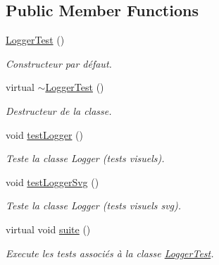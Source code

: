 \subsection*{Public Member Functions}
\begin{DoxyCompactItemize}
\item 
\mbox{\label{classtest_1_1LoggerTest_ad5efe60d6edd7cd1f678f35c96ffda7c}} 
\hyperlink{classtest_1_1LoggerTest_ad5efe60d6edd7cd1f678f35c96ffda7c}{Logger\+Test} ()
\begin{DoxyCompactList}\small\item\em Constructeur par défaut. \end{DoxyCompactList}\item 
\mbox{\label{classtest_1_1LoggerTest_a0b39bfb88761e688eadb93fc44f40fd8}} 
virtual \hyperlink{classtest_1_1LoggerTest_a0b39bfb88761e688eadb93fc44f40fd8}{$\sim$\+Logger\+Test} ()
\begin{DoxyCompactList}\small\item\em Destructeur de la classe. \end{DoxyCompactList}\item 
\mbox{\label{classtest_1_1LoggerTest_af33afe06b02d811ccd1797422af2faf1}} 
void \hyperlink{classtest_1_1LoggerTest_af33afe06b02d811ccd1797422af2faf1}{test\+Logger} ()
\begin{DoxyCompactList}\small\item\em Teste la classe Logger (tests visuels). \end{DoxyCompactList}\item 
\mbox{\label{classtest_1_1LoggerTest_af44724ac76823c62442f20b106d3ae2a}} 
void \hyperlink{classtest_1_1LoggerTest_af44724ac76823c62442f20b106d3ae2a}{test\+Logger\+Svg} ()
\begin{DoxyCompactList}\small\item\em Teste la classe Logger (tests visuels svg). \end{DoxyCompactList}\item 
\mbox{\label{classtest_1_1LoggerTest_af4c75dbd29735b88c4aaf349bc9d4caf}} 
virtual void \hyperlink{classtest_1_1LoggerTest_af4c75dbd29735b88c4aaf349bc9d4caf}{suite} ()
\begin{DoxyCompactList}\small\item\em Execute les tests associés à la classe \hyperlink{classtest_1_1LoggerTest}{Logger\+Test}. \end{DoxyCompactList}\end{DoxyCompactItemize}
